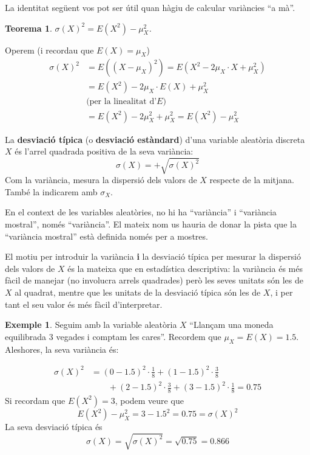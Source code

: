 \documentclass[
]{book}
\newenvironment{rmdblock}[1]
  {
  \begin{itemize}
  \renewcommand{\labelitemi}{
    \raisebox{-.7\height}[0pt][0pt]{
      {\setkeys{Gin}{width=3em,keepaspectratio}\texttt{[image: Bioestadística-II\_files/figure-html/\#1]}}
    }
  }
  \setlength{\fboxsep}{1em}
  \begin{kframe}
  \item
  }
  {
  \end{kframe}
  \end{itemize}
  }
\newenvironment{rmdcaution}
  {\begin{rmdblock}{caution}}
  {\end{rmdblock}}
\newenvironment{rmdcorbes}
  {\begin{rmdblock}{corbes}}
  {\end{rmdblock}}
\newtheorem{theorem}{Teorema}[chapter]
\theoremstyle{definition}
\theoremstyle{definition}
\newtheorem{example}{Exemple}[chapter]
\theoremstyle{definition}
\theoremstyle{remark}
\begin{document}
La identitat següent vos pot ser útil quan hàgiu de calcular variàncies ``a mà''.

\begin{theorem}
\protect\hypertarget{thm:unnamed-chunk-19}{}{\label{thm:unnamed-chunk-19} }\(\sigma(X)^2=E(X^2)-\mu_X^2\).
\end{theorem}

\begin{rmdcorbes}
Operem (i recordau que \(E(X)=\mu_X\))
\[
\begin{array}{rl}
\sigma(X)^2\!\!\!\!\! & =E((X-\mu_X)^2)=E(X^2-2\mu_X\cdot X+\mu_X^2)\\
& = E(X^2)-2\mu_X\cdot E(X)+\mu_X^2\\
& \text{(per la linealitat d'$E$)}\\
& = E(X^2)-2\mu_X^2+\mu_X^2=E(X^2)-\mu_X^2
\end{array}
\]
\end{rmdcorbes}

La \textbf{desviació típica} (o \textbf{desviació estàndard}) d'una variable aleatòria discreta \(X\) és l'arrel quadrada positiva de la seva variància:
\[
\sigma(X)=+\sqrt{\sigma(X)^2}
\]
Com la variància, mesura la dispersió dels valors de \(X\) respecte de la mitjana. També la indicarem amb \(\sigma_X\).

\begin{rmdcaution}
En el context de les variables aleatòries, no hi ha ``variància'' i ``variància mostral'', només ``variància''. El mateix nom us hauria de donar la pista que la ``variància mostral'' està definida només per a mostres.
\end{rmdcaution}

El motiu per introduir la variància \textbf{i} la desviació típica per mesurar la dispersió dels valors de \(X\) és la mateixa que en estadística descriptiva: la variància és més fàcil de manejar (no involucra arrels quadrades) però les seves unitats són les de \(X\) al quadrat, mentre que les unitats de la desviació típica són les de \(X\), i per tant el seu valor és més fàcil d'interpretar.

\begin{example}
\protect\hypertarget{exm:unnamed-chunk-22}{}{\label{exm:unnamed-chunk-22} }Seguim amb la variable aleatòria \(X\) ``Llançam una moneda equilibrada 3 vegades i comptam les cares''. Recordem que \(\mu_X=E(X)=1.5\). Aleshores, la seva variància és:
\end{example}

\[
\begin{array}{rl}
\sigma(X)^2 \!\!\!\!\! & \displaystyle=(0-1.5)^2\cdot \frac{1}{8}+(1-1.5)^2\cdot \frac{3}{8}\\ &\displaystyle\qquad +(2-1.5)^2\cdot \frac{3}{8}+(3-1.5)^2\cdot \frac{1}{8}=0.75
\end{array}
\]
Si recordam que \(E(X^2)=3\), podem veure que
\[
E(X^2)-\mu_X^2=3-1.5^2=0.75=\sigma(X)^2
\]
La seva desviació típica és
\[
\sigma(X) =\sqrt{\sigma(X)^2}=\sqrt{0.75}= 0.866
\]
\end{document}
